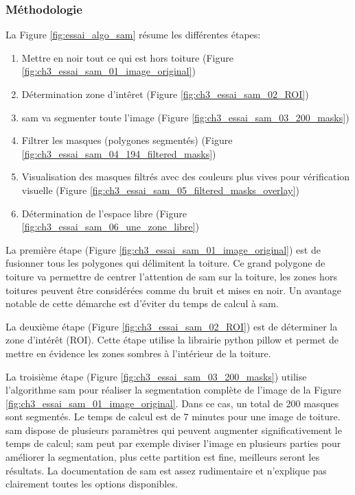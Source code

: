 \subsubsection{Méthodologie}
La Figure \ref{fig:essai_algo_sam} résume les différentes étapes:
\begin{enumerate}
    \item Mettre en noir tout ce qui est hors toiture (Figure \ref{fig:ch3_essai_sam_01_image_original})
    \item Détermination zone d'intêret (Figure \ref{fig:ch3_essai_sam_02_ROI})
    \item \acrshort{sam} va segmenter toute l'image (Figure \ref{fig:ch3_essai_sam_03_200_masks})
    \item Filtrer les masques (polygones segmentés) (Figure \ref{fig:ch3_essai_sam_04_194_filtered_masks})
    \item Visualisation des masques filtrés avec des couleurs plus vives pour vérification visuelle (Figure \ref{fig:ch3_essai_sam_05_filtered_masks_overlay})
    \item Détermination de l'espace libre (Figure \ref{fig:ch3_essai_sam_06_une_zone_libre})
\end{enumerate}

La première étape (Figure \ref{fig:ch3_essai_sam_01_image_original}) est de fusionner tous les polygones qui délimitent la toiture. Ce grand polygone de toiture va permettre de centrer l'attention de \acrshort{sam} sur la toiture, les zones hors toitures peuvent être considérées comme du bruit et mises en noir. Un avantage notable de cette démarche est d'éviter du temps de calcul à \acrshort{sam}.

La deuxième étape (Figure \ref{fig:ch3_essai_sam_02_ROI}) est de déterminer la zone d'intérêt (ROI). Cette étape utilise la librairie python pillow et permet de mettre en évidence les zones sombres à l'intérieur de la toiture.

La troisième étape (Figure \ref{fig:ch3_essai_sam_03_200_masks}) utilise l'algorithme \acrshort{sam} pour réaliser la segmentation complète de l'image de la Figure \ref{fig:ch3_essai_sam_01_image_original}. Dans ce cas, un total de 200 masques sont segmentés. Le temps de calcul est de 7 minutes pour une image de toiture. \acrshort{sam} dispose de plusieurs paramètres qui peuvent augmenter significativement le temps de calcul; \acrshort{sam} peut par exemple diviser l'image en plusieurs parties pour améliorer la segmentation, plus cette partition est fine, meilleurs seront les résultats. La documentation de \acrshort{sam} est assez rudimentaire et n'explique pas clairement toutes les options disponibles.

